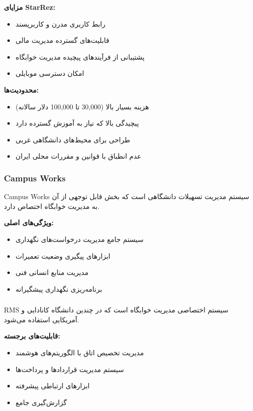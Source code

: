 \documentclass[12pt,a4paper]{report}
\begin{document}
	\textbf{مزایای StarRez:}
	\begin{itemize}
		\item رابط کاربری مدرن و کاربرپسند
		\item قابلیت‌های گسترده مدیریت مالی
		\item پشتیبانی از فرآیندهای پیچیده مدیریت خوابگاه
		\item امکان دسترسی موبایلی
	\end{itemize}
	
	\textbf{محدودیت‌ها:}
	\begin{itemize}
		\item هزینه بسیار بالا (30,000 تا 100,000 دلار سالانه)
		\item پیچیدگی بالا که نیاز به آموزش گسترده دارد
		\item طراحی برای محیط‌های دانشگاهی غربی
		\item عدم انطباق با قوانین و مقررات محلی ایران
	\end{itemize}
	
	\subsubsection{Campus Works}
	
	Campus Works سیستم مدیریت تسهیلات دانشگاهی است که بخش قابل توجهی از آن به مدیریت خوابگاه اختصاص دارد.
	
	\textbf{ویژگی‌های اصلی:}
	\begin{itemize}
		\item سیستم جامع مدیریت درخواست‌های نگهداری
		\item ابزارهای پیگیری وضعیت تعمیرات
		\item مدیریت منابع انسانی فنی
		\item برنامه‌ریزی نگهداری پیشگیرانه
	\end{itemize}
	
	\subsubsection{}
	
	RMS سیستم اختصاصی مدیریت خوابگاه است که در چندین دانشگاه کانادایی و آمریکایی استفاده می‌شود.
	
	\textbf{قابلیت‌های برجسته:}
	\begin{itemize}
		\item مدیریت تخصیص اتاق با الگوریتم‌های هوشمند
		\item سیستم مدیریت قراردادها و پرداخت‌ها
		\item ابزارهای ارتباطی پیشرفته
		\item گزارش‌گیری جامع
	\end{itemize}
	
\end{document}
